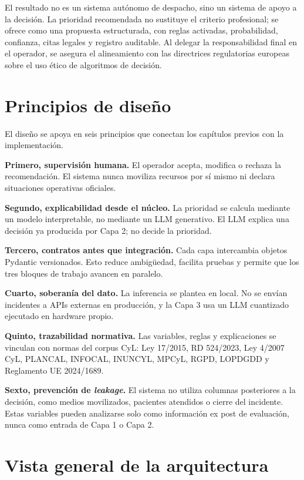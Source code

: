 El resultado no es un sistema autónomo de despacho, sino un sistema de apoyo a la decisión. La prioridad recomendada no sustituye el criterio profesional; se ofrece como una propuesta estructurada, con reglas activadas, probabilidad, confianza, citas legales y registro auditable. Al delegar la responsabilidad final en el operador, se asegura el alineamiento con las directrices regulatorias europeas sobre el uso ético de algoritmos de decisión.

\section{Principios de diseño}

El diseño se apoya en seis principios que conectan los capítulos previos con la implementación.

\textbf{Primero, supervisión humana.} El operador acepta, modifica o rechaza la recomendación. El sistema nunca moviliza recursos por sí mismo ni declara situaciones operativas oficiales.

\textbf{Segundo, explicabilidad desde el núcleo.} La prioridad se calcula mediante un modelo interpretable, no mediante un LLM generativo. El LLM explica una decisión ya producida por Capa 2; no decide la prioridad.

\textbf{Tercero, contratos antes que integración.} Cada capa intercambia objetos Pydantic versionados. Esto reduce ambigüedad, facilita pruebas y permite que los tres bloques de trabajo avancen en paralelo.

\textbf{Cuarto, soberanía del dato.} La inferencia se plantea en local. No se envían incidentes a APIs externas en producción, y la Capa 3 usa un LLM cuantizado ejecutado en hardware propio.

\textbf{Quinto, trazabilidad normativa.} Las variables, reglas y explicaciones se vinculan con normas del corpus CyL: Ley 17/2015, RD 524/2023, Ley 4/2007 CyL, PLANCAL, INFOCAL, INUNCYL, MPCyL, RGPD, LOPDGDD y Reglamento UE 2024/1689.

\textbf{Sexto, prevención de \textit{leakage}.} El sistema no utiliza columnas posteriores a la decisión, como medios movilizados, pacientes atendidos o cierre del incidente. Estas variables pueden analizarse solo como información ex post de evaluación, nunca como entrada de Capa 1 o Capa 2.

\section{Vista general de la arquitectura}

